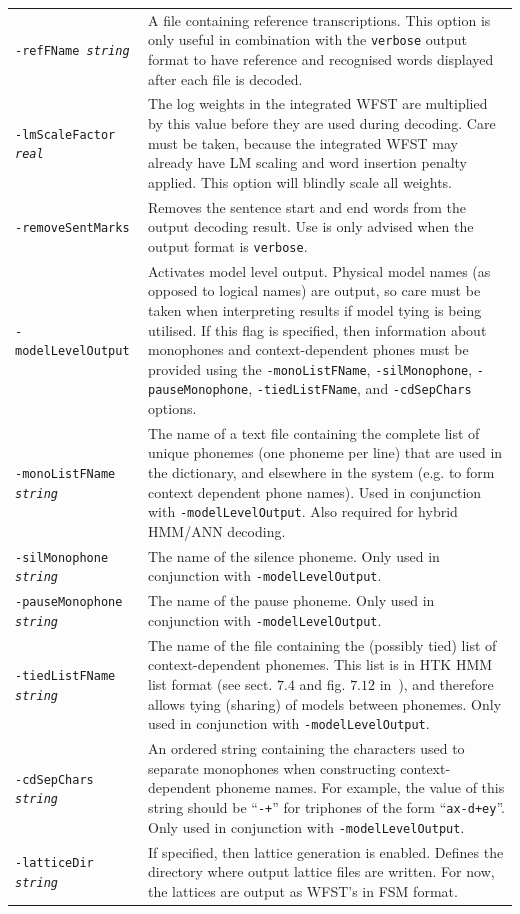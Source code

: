 \documentclass[a4paper,12pt]{report}
\begin{document}
\begin{center}
\begin{longtable}{lp{9cm}}
{\tt -refFName \emph{string}} & A file containing reference transcriptions. This option is only useful in combination with the {\tt verbose} output format to have reference and recognised words displayed after each file is decoded. \\
{\tt -lmScaleFactor \emph{real}} & The log weights in the integrated WFST are multiplied by this value before they are used during decoding. Care must be taken, because the integrated WFST may already have LM scaling and word insertion penalty applied. This option will blindly scale all weights. \\
{\tt -removeSentMarks} & Removes the sentence start and end words from the output decoding result. Use is only advised when the output format is {\tt verbose}. \\
{\tt -modelLevelOutput} & Activates model level output. Physical model names (as opposed to logical names) are output, so care must be taken when interpreting results if model tying is being utilised. If this flag is specified, then information about monophones and context-dependent phones must be provided using the {\tt -monoListFName}, {\tt -silMonophone}, {\tt -pauseMonophone}, {\tt -tiedListFName}, and {\tt -cdSepChars} options. \\
{\tt -monoListFName \emph{string}} & The name of a text file containing the complete list of unique phonemes (one phoneme per line) that are used in the dictionary, and elsewhere in the system (e.g. to form context dependent phone names). Used in conjunction with {\tt -modelLevelOutput}. Also required for hybrid HMM/ANN decoding. \\
{\tt -silMonophone \emph{string}} & The name of the silence phoneme. Only used in conjunction with {\tt -modelLevelOutput}. \\
{\tt -pauseMonophone \emph{string}} & The name of the pause phoneme. Only used in conjunction with {\tt -modelLevelOutput}. \\
{\tt -tiedListFName \emph{string}} & The name of the file containing the (possibly tied) list of context-dependent phonemes. This list is in HTK HMM list format (see sect. $7.4$ and fig. $7.12$ in~\cite{htkbook321}), and therefore allows tying (sharing) of models between phonemes. Only used in conjunction with {\tt -modelLevelOutput}. \\
{\tt -cdSepChars \emph{string}} & An ordered string containing the characters used to separate monophones when constructing context-dependent phoneme names. For example, the value of this string should be ``{\tt -+}'' for triphones of the form ``{\tt ax-d+ey}''. Only used in conjunction with {\tt -modelLevelOutput}. \\
{\tt -latticeDir \emph{string}} & If specified, then lattice generation is enabled. Defines the directory where output lattice files are written. For now, the lattices are output as WFST's in FSM format. \\
\end{longtable}
\end{center}
\end{document}
